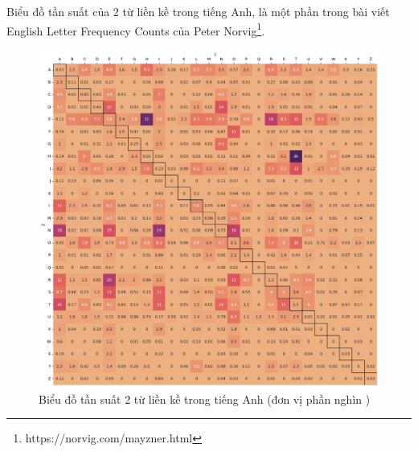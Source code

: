 \newpage
Biểu đồ tần suất của 2 từ liền kề trong tiếng Anh, là một phần trong bài viết English Letter Frequency Counts của Peter Norvig\footnote{https://norvig.com/mayzner.html}.
\begin{figure}[htb]
    \centering
    \includegraphics[width=\textwidth]{chapter_2/image/norvig_bigram_frequency.png}
    \caption{Biểu đồ tần suất 2 từ liền kề trong tiếng Anh (đơn vị phần nghìn \textperthousand)}
    \label{figure:english_bigram_frequency}
\end{figure}

\newpage
